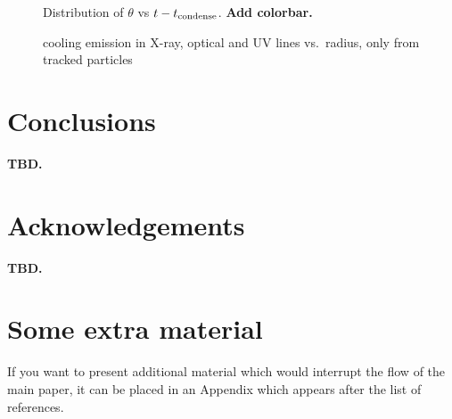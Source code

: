 \documentclass[fleqn,usenatbib]{mnras}
\begin{document}
\begin{figure}
    \centering
    \caption{
    Distribution of $\theta$ vs $t - t_{\rm condense}$.
    \textbf{Add colorbar.}
    }
    \label{f: theta vs R}
\end{figure}



\begin{figure}
    \centering
    \caption{cooling emission in X-ray, optical and UV lines vs.\ radius, only from tracked particles}
    \label{f:emission}
\end{figure}

\section{Conclusions}

\textbf{TBD.}

\section*{Acknowledgements}

\textbf{TBD.}











\appendix

\section{Some extra material}

If you want to present additional material which would interrupt the flow of the main paper,
it can be placed in an Appendix which appears after the list of references.



\bsp	%
\label{lastpage}
\end{document}
